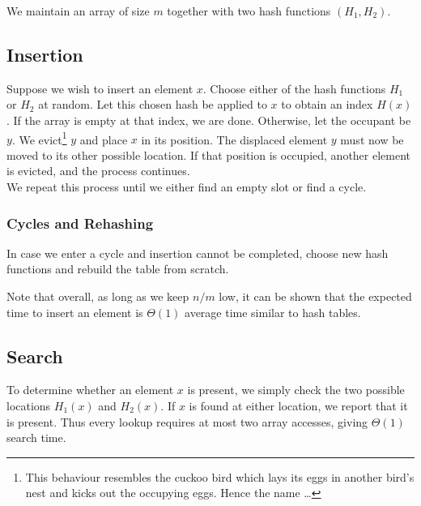 We maintain an array of size $m$ together with two hash functions $(H_1,H_2)$.

\begin{center}
\end{center}

\subsection{Insertion}
Suppose we wish to insert an element $x$. Choose either of the hash functions $H_1$ or $H_2$ at random. 
Let this chosen hash be applied to $x$ to obtain an index $H(x)$. If the array is empty at that index, 
we are done. Otherwise, let the occupant be $y$. We evict\footnote{This behaviour resembles the cuckoo 
bird which lays its eggs in another bird's nest and kicks out the occupying eggs. Hence the name \dots} $y$ 
and place $x$ in its position. The displaced element $y$ must now be 
moved to its other possible location. If that position is occupied, 
another element is evicted, and the process continues.\\

\noindent We repeat this process until we either find an empty slot or find a 
cycle. 

\subsubsection*{Cycles and Rehashing}
In case we enter a cycle and insertion cannot be completed, choose new hash functions and 
rebuild the table from scratch. 

Note that overall, as long as we keep $n/m$ low, it can be shown that the expected time to 
insert an element is \(\Theta(1)\) average time similar to hash tables.
\subsection{Search}

To determine whether an element $x$ is present, we simply check the 
two possible locations $H_1(x)$ and  $H_2(x)$. If $x$ is found at either location, 
we report that it is present. Thus every lookup requires at most two array accesses, 
giving $\Theta(1)$ search time.

